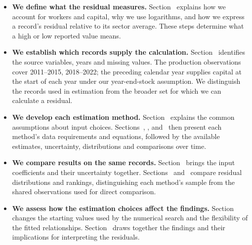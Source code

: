 \begin{itemize}
\item \textbf{We define what the residual measures.} Section~ explains how we account for workers and capital, why we use logarithms, and how we express a record's residual relative to its sector average. These steps determine what a high or low reported value means.
\item \textbf{We establish which records supply the calculation.} Section~ identifies the source variables, years and missing values. The production observations cover 2011--2015, 2018--2022; the preceding calendar year supplies capital at the start of each year under our year-end-stock assumption. We distinguish the records used in estimation from the broader set for which we can calculate a residual.
\item \textbf{We develop each estimation method.} Section~ explains the common assumptions about input choices. Sections~, ,  and~ then present each method's data requirements and equations, followed by the available estimates, uncertainty, distributions and comparisons over time.
\item \textbf{We compare results on the same records.} Section~ brings the input coefficients and their uncertainty together. Sections~ and~ compare residual distributions and rankings, distinguishing each method's sample from the shared observations used for direct comparison.
\item \textbf{We assess how the estimation choices affect the findings.} Section~ changes the starting values used by the numerical search and the flexibility of the fitted relationships. Section~ draws together the findings and their implications for interpreting the residuals.
\end{itemize}

